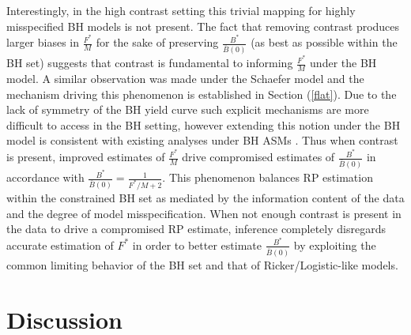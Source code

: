 %
Interestingly, in the high contrast setting this trivial mapping for 
highly misspecified BH models is not present. The fact that removing contrast 
produces larger biases in $\frac{F^*}{M}$ for the sake of 
preserving $\frac{B^*}{\bar B(0)}$ (as best as possible within the BH set) suggests that 
contrast is fundamental to informing $\frac{F^*}{M}$ under the BH model. 
A similar observation was made under the Schaefer model and the mechanism driving this phenomenon %
is established in Section (\ref{flat}).
Due to the lack of symmetry of the BH yield 
curve such explicit mechanisms are more difficult to access in the BH setting, however extending this 
notion under the BH model is consistent with existing analyses under BH ASMs \cite{conn_when_2010, lee_can_2012}.    
Thus when contrast is present, improved estimates of $\frac{F^*}{M}$ drive 
compromised estimates of $\frac{B^*}{\bar B(0)}$
in accordance with $\frac{B^*}{\bar B(0)}=\frac{1}{F^*/M+2}$.
This phenomenon balances RP estimation within the constrained BH set as
mediated by the information content of the data and the degree of model
misspecification. When not enough contrast is present in the data to %
drive a compromised RP estimate, inference completely disregards accurate
estimation of $F^*$ in order to better estimate $\frac{B^*}{\bar B(0)}$
by exploiting the common limiting behavior of the BH set and that of
Ricker/Logistic-like models.



\section{Discussion}

